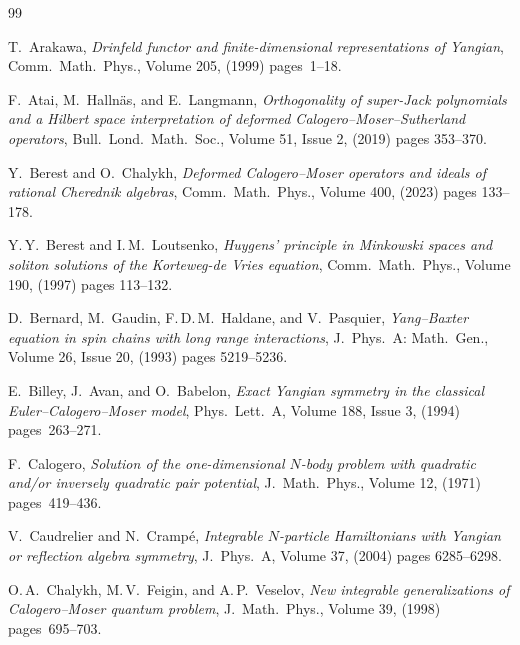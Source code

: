 \documentclass[12pt]{amsart}
\numberwithin{equation}{section}
\theoremstyle{definition}
\begin{document}
\begin{small}
\begin{thebibliography}{99}

\footnotesize{

T.\ Arakawa, \textit{Drinfeld functor and finite-dimensional representations of Yangian}, Comm.\ Math.\ Phys., Volume 205, (1999) pages~1--18.

F.\ Atai, M.\ Hallnäs, and E.\ Langmann, \textit{Orthogonality of super-Jack polynomials and a Hilbert space interpretation of deformed Calogero--Moser--Sutherland operators}, Bull.\ Lond.\ Math.\ Soc., Volume 51, Issue 2, (2019) pages 353--370.

Y.\ Berest and O.\ Chalykh, \textit{Deformed Calogero--Moser operators and ideals of rational Cherednik algebras}, Comm.\ Math.\ Phys., Volume 400, (2023) pages 133--178.

Y.\,Y.\ Berest and I.\,M.\ Loutsenko,  \textit{Huygens' principle in Minkowski spaces and soliton solutions of the Korteweg-de Vries equation}, Comm.\ Math.\ Phys., Volume 190, (1997) pages 113–132. 

D.\ Bernard, M.\ Gaudin, F.\,D.\,M.\ Haldane, and V.\ Pasquier, \textit{Yang--Baxter equation in spin chains with long range interactions}, J.\ Phys.\ A: Math.\ Gen., Volume 26, Issue 20,  (1993) pages 5219--5236.

E.\ Billey, J.\ Avan, and O.\ Babelon, \textit{Exact Yangian symmetry in the classical Euler--Calogero--Moser model}, Phys.\ Lett.\ A, Volume 188, Issue 3, (1994) pages~263--271.


F.\ Calogero, \textit{Solution of the one-dimensional $N$-body problem with quadratic and/or inversely quadratic pair potential}, J.\ Math.\ Phys., Volume 12, (1971) pages~419--436.

V.\ Caudrelier and N.\ Cramp\'e, \textit{Integrable $N$-particle Hamiltonians with Yangian or reflection algebra symmetry}, 
J.\ Phys.\ A, Volume 37, (2004) pages 6285--6298.

O.\,A.\ Chalykh, M.\,V.\ Feigin, and A.\,P.\ Veselov, \textit{New integrable generalizations of Calogero–Moser quantum problem}, J.\ Math.\ Phys., Volume 39, (1998) pages~695--703.

}
\end{thebibliography}
\end{small}
\end{document}
